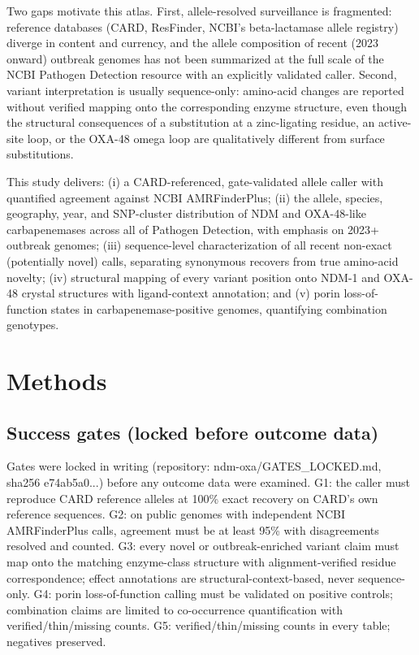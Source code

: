 \documentclass[11pt]{article}
\begin{document}
Two gaps motivate this atlas. First, allele-resolved surveillance is fragmented: reference databases (CARD, ResFinder, NCBI's beta-lactamase allele registry) diverge in content and currency, and the allele composition of recent (2023 onward) outbreak genomes has not been summarized at the full scale of the NCBI Pathogen Detection resource with an explicitly validated caller. Second, variant interpretation is usually sequence-only: amino-acid changes are reported without verified mapping onto the corresponding enzyme structure, even though the structural consequences of a substitution at a zinc-ligating residue, an active-site loop, or the OXA-48 omega loop are qualitatively different from surface substitutions.

This study delivers: (i) a CARD-referenced, gate-validated allele caller with quantified agreement against NCBI AMRFinderPlus; (ii) the allele, species, geography, year, and SNP-cluster distribution of NDM and OXA-48-like carbapenemases across all of Pathogen Detection, with emphasis on 2023+ outbreak genomes; (iii) sequence-level characterization of all recent non-exact (potentially novel) calls, separating synonymous recovers from true amino-acid novelty; (iv) structural mapping of every variant position onto NDM-1 and OXA-48 crystal structures with ligand-context annotation; and (v) porin loss-of-function states in carbapenemase-positive genomes, quantifying combination genotypes.

\section{Methods}
\subsection{Success gates (locked before outcome data)}
Gates were locked in writing (repository: ndm-oxa/GATES\_LOCKED.md, sha256 e74ab5a0...) before any outcome data were examined. G1: the caller must reproduce CARD reference alleles at 100\% exact recovery on CARD's own reference sequences. G2: on public genomes with independent NCBI AMRFinderPlus calls, agreement must be at least 95\% with disagreements resolved and counted. G3: every novel or outbreak-enriched variant claim must map onto the matching enzyme-class structure with alignment-verified residue correspondence; effect annotations are structural-context-based, never sequence-only. G4: porin loss-of-function calling must be validated on positive controls; combination claims are limited to co-occurrence quantification with verified/thin/missing counts. G5: verified/thin/missing counts in every table; negatives preserved.
\end{document}
